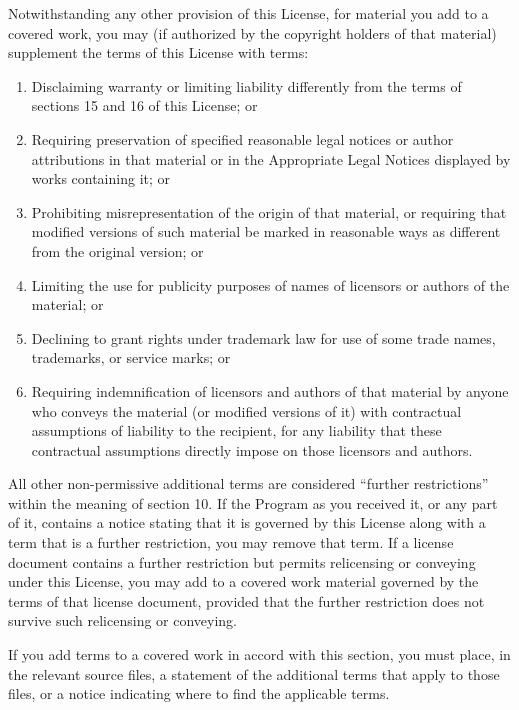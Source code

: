 \documentclass[11pt]{article}
\begin{document}
\begin{enumerate}
Notwithstanding any other provision of this License, for material you
add to a covered work, you may (if authorized by the copyright holders of
that material) supplement the terms of this License with terms:
  \begin{enumerate}
  \item Disclaiming warranty or limiting liability differently from the
  terms of sections 15 and 16 of this License; or

  \item Requiring preservation of specified reasonable legal notices or
  author attributions in that material or in the Appropriate Legal
  Notices displayed by works containing it; or

  \item Prohibiting misrepresentation of the origin of that material, or
  requiring that modified versions of such material be marked in
  reasonable ways as different from the original version; or

  \item Limiting the use for publicity purposes of names of licensors or
  authors of the material; or

  \item Declining to grant rights under trademark law for use of some
  trade names, trademarks, or service marks; or

  \item Requiring indemnification of licensors and authors of that
  material by anyone who conveys the material (or modified versions of
  it) with contractual assumptions of liability to the recipient, for
  any liability that these contractual assumptions directly impose on
  those licensors and authors.
  \end{enumerate}

All other non-permissive additional terms are considered ``further
restrictions'' within the meaning of section 10.  If the Program as you
received it, or any part of it, contains a notice stating that it is
governed by this License along with a term that is a further
restriction, you may remove that term.  If a license document contains
a further restriction but permits relicensing or conveying under this
License, you may add to a covered work material governed by the terms
of that license document, provided that the further restriction does
not survive such relicensing or conveying.

If you add terms to a covered work in accord with this section, you
must place, in the relevant source files, a statement of the
additional terms that apply to those files, or a notice indicating
where to find the applicable terms.


\end{enumerate}
\end{document}
